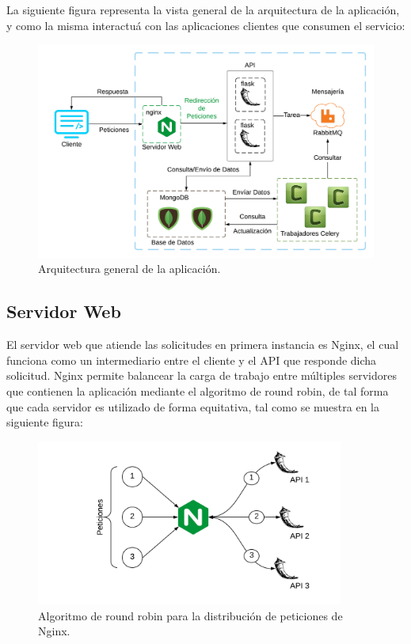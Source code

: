 La siguiente figura representa la vista general de la arquitectura de la aplicación, y como la misma interactuá con
las aplicaciones clientes que consumen el servicio:

\begin{figure}[H]
	\centering
		\includegraphics[width=1\textwidth]{figures/diagram_general}
	\caption{Arquitectura general de la aplicación.}
	\label{fig:diagram_general}

\end{figure}

\subsection{Servidor Web}

El servidor web que atiende las solicitudes en primera instancia es Nginx,
el cual funciona como un intermediario entre el cliente y el API que responde dicha solicitud.
Nginx permite balancear la carga de trabajo entre múltiples servidores que contienen la aplicación mediante el algoritmo de round robin,
de tal forma que cada servidor es utilizado de forma equitativa, tal como se muestra en la siguiente figura:

\begin{figure}[H]
	\centering
		\includegraphics[width=0.9\textwidth]{figures/round_robin}
	\caption{Algoritmo de round robin para la distribución de peticiones de Nginx.}
	\label{fig:round_robin}
\end{figure}

